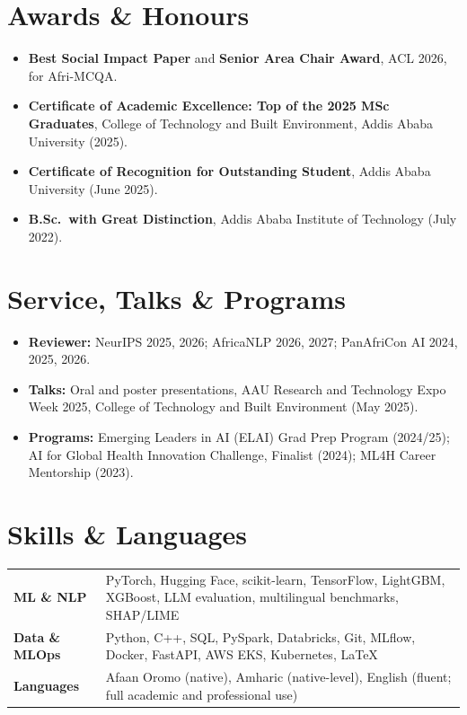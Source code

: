 \documentclass[10pt,a4paper]{article}
\begin{document}
\section{Awards \& Honours}
\begin{itemize}
  \item \textbf{Best Social Impact Paper} and \textbf{Senior Area Chair Award}, ACL 2026, for Afri-MCQA.
  \item \textbf{Certificate of Academic Excellence: Top of the 2025 MSc Graduates}, College of Technology and Built Environment, Addis Ababa University (2025).
  \item \textbf{Certificate of Recognition for Outstanding Student}, Addis Ababa University (June 2025).
  \item \textbf{B.Sc.\ with Great Distinction}, Addis Ababa Institute of Technology (July 2022).
\end{itemize}

\section{Service, Talks \& Programs}
\begin{itemize}
  \item \textbf{Reviewer:} NeurIPS 2025, 2026; AfricaNLP 2026, 2027; PanAfriCon AI 2024, 2025, 2026.
  \item \textbf{Talks:} Oral and poster presentations, AAU Research and Technology Expo Week 2025, College of Technology and Built Environment (May 2025).
  \item \textbf{Programs:} Emerging Leaders in AI (ELAI) Grad Prep Program (2024/25); AI for Global Health Innovation Challenge, Finalist (2024); ML4H Career Mentorship (2023).
\end{itemize}

\section{Skills \& Languages}
\begin{tabularx}{\linewidth}{@{}l X@{}}
\textbf{ML \& NLP} & PyTorch, Hugging Face, scikit-learn, TensorFlow, LightGBM, XGBoost, LLM evaluation, multilingual benchmarks, SHAP/LIME \\
\textbf{Data \& MLOps} & Python, C++, SQL, PySpark, Databricks, Git, MLflow, Docker, FastAPI, AWS EKS, Kubernetes, \LaTeX \\
\textbf{Languages} & Afaan Oromo (native), Amharic (native-level), English (fluent; full academic and professional use) \\
\end{tabularx}
\end{document}
